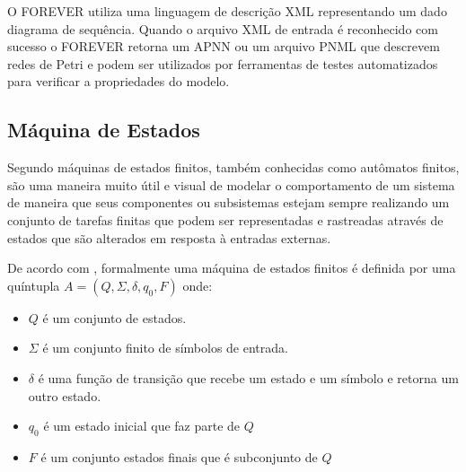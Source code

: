 O FOREVER \cite{forever} utiliza uma linguagem de descrição XML representando um dado diagrama de sequência. Quando o arquivo XML de entrada é reconhecido com sucesso o FOREVER retorna um APNN ou um arquivo PNML que descrevem redes de Petri e podem ser utilizados por ferramentas de testes automatizados para verificar a propriedades do modelo. 







\subsection{Máquina de Estados}

Segundo  máquinas de estados finitos, também conhecidas como autômatos finitos, são uma maneira muito útil e visual de modelar o comportamento de um sistema de maneira que seus componentes ou subsistemas estejam sempre realizando um conjunto de tarefas finitas que podem ser representadas e rastreadas através de estados que são alterados em resposta à entradas externas. 

De acordo com , formalmente uma máquina de estados finitos é definida por uma quíntupla $A = (Q, \Sigma, \delta, q_0, F)$ onde:

\begin{itemize}
    \item $Q$ é um conjunto de estados.
    \item $\Sigma$ é um conjunto finito de símbolos de entrada.
    \item $\delta$ é uma função de transição que recebe um estado e um símbolo e retorna um outro estado.
    \item $q_0$ é um estado inicial que faz parte de $Q$
    \item $F$ é um conjunto estados finais que é subconjunto de $Q$ 
\end{itemize}


